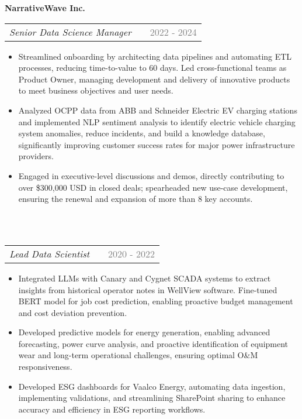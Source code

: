 \documentclass[a4paper,12pt]{article}
\makeatletter
\newenvironment{joblong}[3]
    {
    \noindent\textbf{\large #1}\\ %
    \begin{tabularx}{\linewidth}{@{}l X r@{}}
    \textit{#2} & &  {\textcolor{gray}{#3}} \\[3.75pt] %
    \end{tabularx}
    \begin{minipage}[t]{\linewidth}
    \begin{itemize}[nosep,after=\strut, leftmargin=1em, itemsep=3pt,label=--]
    }
    {
    \end{itemize}
    \end{minipage}    
    }
\makeatother
\begin{document}
\begin{joblong}{NarrativeWave Inc.}{Senior Data Science Manager}{2022 - 2024}
    \item Streamlined onboarding by architecting data pipelines and automating ETL processes, reducing time-to-value to 60 days. Led cross-functional teams as Product Owner, managing development and delivery of innovative products to meet business objectives and user needs.
    \item Analyzed OCPP data from ABB and Schneider Electric EV charging stations and implemented NLP sentiment analysis to identify electric vehicle charging system anomalies, reduce incidents, and build a knowledge database, significantly improving customer success rates for major power infrastructure providers.
    \item Engaged in executive-level discussions and demos, directly contributing to over \$300,000 USD in closed deals; spearheaded new use-case development, ensuring the renewal and expansion of more than 8 key accounts.
\end{joblong}
\\
\begin{joblong}{}{Lead Data Scientist}{2020 - 2022}
    \item Integrated LLMs with Canary and Cygnet SCADA systems to extract insights from historical operator notes in WellView software. Fine-tuned BERT model for job cost prediction, enabling proactive budget management and cost deviation prevention.
    \item Developed predictive models for energy generation, enabling advanced forecasting, power curve analysis, and proactive identification of equipment wear and long-term operational challenges, ensuring optimal O\&M responsiveness. 
    \item Developed ESG dashboards for Vaalco Energy, automating data ingestion, implementing validations, and streamlining SharePoint sharing to enhance accuracy and efficiency in ESG reporting workflows.
\end{joblong}
\\
\end{document}
